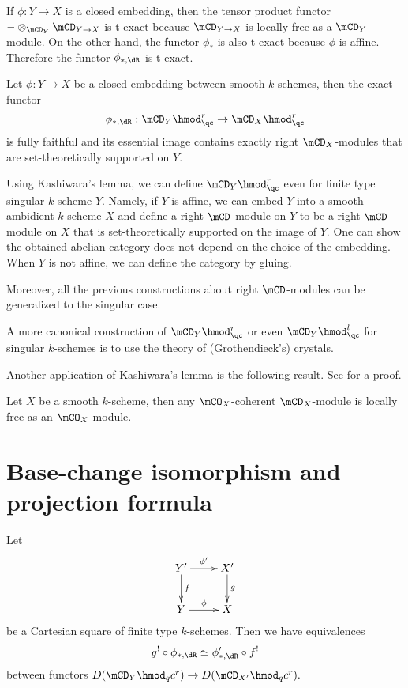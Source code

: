 	If $\phi:Y\to X$ is a closed embedding, then the tensor product functor $-\ot_{\mCD_Y} \mCD_{Y\to X}$ is t-exact because $\mCD_{Y\to X}$ is locally free as a $\mCD_Y$-module. On the other hand, the functor $\phi_*$ is also t-exact because $\phi$ is affine. Therefore the functor $\phi_{*,\dR} $ is t-exact. 

	\begin{thm}
		Let $\phi:Y \to X$ be a closed embedding between smooth $k$-schemes, then the exact functor
		\[
			\phi_{*,\dR}:  \mCD_Y\hmod_\qc^r  \to  \mCD_X\hmod_\qc^r
		\]
		is fully faithful and its essential image contains exactly right $\mCD_X$-modules that are set-theoretically supported on $Y$.
	\end{thm}


	

	\begin{rem}
		Using Kashiwara's lemma, we can define $\mCD_Y\hmod_\qc^r$ even for finite type singular $k$-scheme $Y$. Namely, if $Y$ is affine, we can embed $Y$ into a smooth ambidient $k$-scheme $X$ and define a right $\mCD$-module on $Y$ to be a right $\mCD$-module on $X$ that is set-theoretically supported on the image of $Y$. One can show the obtained abelian category does not depend on the choice of the embedding. When $Y$ is not affine, we can define the category by gluing.

		Moreover, all the previous constructions about right $\mCD$-modules can be generalized to the singular case.

		A more canonical construction of $\mCD_Y\hmod_\qc^r$ or even $\mCD_Y\hmod_\qc^l$ for singular $k$-schemes is to use the theory of (Grothendieck's) crystals.
	\end{rem}

	Another application of Kashiwara's lemma is the following result. See \cite[Sect. 5.12]{G} for a proof.

	\begin{cor}
		Let $X$ be a smooth $k$-scheme, then any $\mCO_X$-coherent $\mCD_X$-module is locally free as an $\mCO_X$-module.
	\end{cor}

\section{Base-change isomorphism and projection formula}
	\begin{facts}
		Let
		\[
			\xymatrix{
				Y' \ar[r]^-{\phi'} \ar[d]^-f & X' \ar[d]^-g \\
				Y \ar[r]^-\phi & X
			}
		\]
		be a Cartesian square of finite type $k$-schemes. Then we have equivalences
		\[
			g^!\circ \phi_{*,\dR} \simeq \phi'_{*,\dR}\circ f^!
		\]
		between functors $D( \mCD_Y\hmod_qc^r ) \to D( \mCD_{X'}\hmod_qc^r ). $
	\end{facts}

